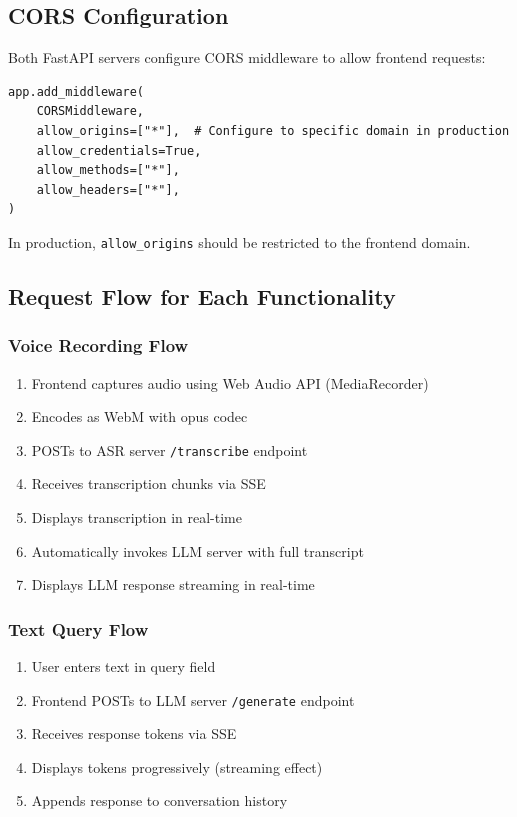 \documentclass[12pt,a4paper]{report}
\begin{document}
\subsection{CORS Configuration}

Both FastAPI servers configure CORS middleware to allow frontend requests:

\begin{verbatim}
app.add_middleware(
    CORSMiddleware,
    allow_origins=["*"],  # Configure to specific domain in production
    allow_credentials=True,
    allow_methods=["*"],
    allow_headers=["*"],
)
\end{verbatim}

In production, \texttt{allow\_origins} should be restricted to the frontend domain.

\subsection{Request Flow for Each Functionality}

\subsubsection{Voice Recording Flow}

\begin{enumerate}
    \item Frontend captures audio using Web Audio API (MediaRecorder)
    \item Encodes as WebM with opus codec
    \item POSTs to ASR server \texttt{/transcribe} endpoint
    \item Receives transcription chunks via SSE
    \item Displays transcription in real-time
    \item Automatically invokes LLM server with full transcript
    \item Displays LLM response streaming in real-time
\end{enumerate}

\subsubsection{Text Query Flow}

\begin{enumerate}
    \item User enters text in query field
    \item Frontend POSTs to LLM server \texttt{/generate} endpoint
    \item Receives response tokens via SSE
    \item Displays tokens progressively (streaming effect)
    \item Appends response to conversation history
\end{enumerate}
\end{document}
